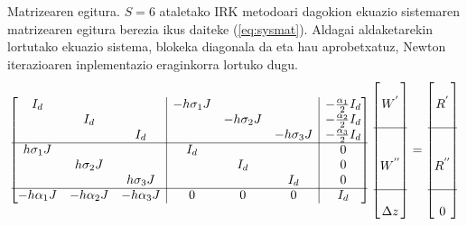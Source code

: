 Matrizearen egitura. $S=6$ ataletako IRK metodoari dagokion ekuazio sistemaren matrizearen egitura berezia ikus daiteke (\ref{eq:sysmat}). Aldagai aldaketarekin lortutako ekuazio sistema, blokeka diagonala da eta hau aprobetxatuz, Newton iterazioaren inplementazio eraginkorra lortuko dugu.    
\begin{equation}
\label{eq:sysmat}
\begin{bmatrix}
 I_d        &             &                     & \multicolumn{1}{|c}{-h\sigma_1 J} &            &                  &\multicolumn{1}{|c}{-\frac{\alpha_1}{2} I_d}\\
            & I_d         &                     & \multicolumn{1}{|c}{}           & -h\sigma_2 J &                
 &\multicolumn{1}{|c}{-\frac{\alpha_2}{2} I_d}\\
            &             & I_d                 & \multicolumn{1}{|c}{}           &            & -h\sigma_3 J  
 &\multicolumn{1}{|c}{-\frac{\alpha_3}{2} I_d}\\\cline{1-7}    
h\sigma_1 J &             &                     & \multicolumn{1}{|c}{I_d}        &            &            
 &\multicolumn{1}{|c}{0}\\
            & h\sigma_2 J &                     & \multicolumn{1}{|c}{}           &  I_d       &             
 &\multicolumn{1}{|c}{0}\\
            &             &  h\sigma_3 J        & \multicolumn{1}{|c}{}           &            &  I_d        
 &\multicolumn{1}{|c}{0}\\\cline{1-7}
 -h\alpha_1 J       & -h\alpha_2 J              &  -h\alpha_3 J                    & \multicolumn{1}{|c}{$0$}        &  $0$       &  $0$         
 &\multicolumn{1}{|c}{ I_d}\\
\end{bmatrix}
\begin{bmatrix}
         \\
 W^{'} \\
    \\
\cline{1-1} \\
    \\
 W^{''}   \\
    \\
    \cline{1-1} \\
 \Delta z  \\
\end{bmatrix}=
\begin{bmatrix}
         \\
 R^{'} \\
    \\
\cline{1-1} \\
    \\
 R^{''}   \\
    \\
    \cline{1-1} \\
 0  \\
\end{bmatrix}
\end{equation} 
